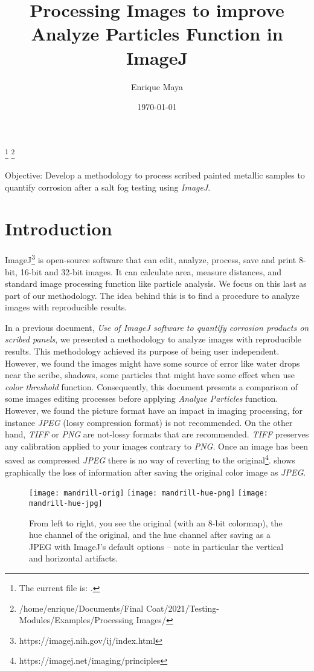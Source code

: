 \documentclass[10pt, fleqn]{article}    %
\title{Processing Images to improve Analyze Particles Function in ImageJ}
\author{Enrique Maya}
\date{\today}
\begin{document}
	\maketitle
	\footnote{The current file is: \currfilename.} %
	\footnote{/home/enrique/Documents/Final Coat/2021/Testing-Modules/Examples/Processing Images/}
	
	Objective: Develop a methodology to process scribed painted metallic samples to quantify corrosion after a salt fog testing using \textit{ImageJ}.
	
	
	\section*{Introduction}
	
		ImageJ\footnote{https://imagej.nih.gov/ij/index.html} is open-source software that can edit, analyze, process, save and print 8-bit, 16-bit and 32-bit images. It can calculate area, measure distances, and standard image processing function like particle analysis. We focus on this last as part of our methodology. The idea behind this is to find a procedure to analyze images with reproducible results. 
		
		In a previous document, \textit{Use of ImageJ software to quantify corrosion products on scribed panels}, we presented a methodology to analyze images with reproducible results. This methodology achieved its purpose of being user independent. However, we found the images might have some source of error like water drops near the scribe, shadows, some particles that might have some effect when use \textit{color threshold} function. Consequently, this document presents a comparison of some images editing processes before applying \textit{Analyze Particles} function.  However, we found the picture format have an impact in imaging processing, for instance \textit{JPEG} (lossy compression format) is not recommended. On the other hand, \textit{TIFF} or \textit{PNG} are not-lossy formats that are recommended. \textit{TIFF} preserves any calibration applied to your images contrary to \textit{PNG}. Once an image has been saved as compressed \textit{JPEG} there is no way of reverting to the original\footnote{https://imagej.net/imaging/principles}.  shows graphically the loss of information after saving the original color image as \textit{JPEG}. 
		
			\begin{figure}[H]
			\centering
			\texttt{[image: mandrill-orig]}
			 \texttt{[image: mandrill-hue-png]}
			 \texttt{[image: mandrill-hue-jpg]}
			\caption{From left to right, you see the original (with an 8-bit colormap), the hue channel of the original, and the hue channel after saving as a JPEG with ImageJ’s default options – note in particular the vertical and horizontal artifacts.}
			\label{fig:Mandril}
		\end{figure}
		
\end{document}
